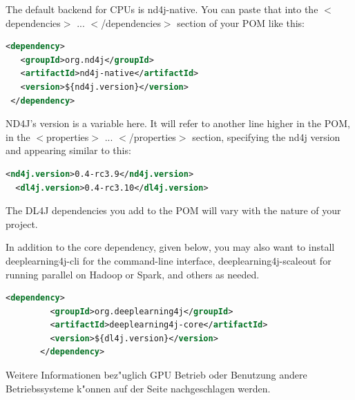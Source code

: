 {The default backend for CPUs is nd4j-native. You can paste that into the $<$dependencies$>$ ... $<$/dependencies$>$ section of your POM like this:
\lstset{language=XML}
\begin{lstlisting}[language=XML,caption=applicationContext.xml]
 <dependency>
   <groupId>org.nd4j</groupId>
   <artifactId>nd4j-native</artifactId>
   <version>${nd4j.version}</version>
 </dependency>
\end{lstlisting}

ND4J’s version is a variable here. It will refer to another line higher in the POM, in the $<$properties$>$ ... 
$<$/properties$>$ section, specifying the nd4j version and appearing similar to this:
\begin{lstlisting}[language=XML,caption=applicationContext.xml]
  <nd4j.version>0.4-rc3.9</nd4j.version>
  <dl4j.version>0.4-rc3.10</dl4j.version>
\end{lstlisting}

The DL4J dependencies you add to the POM will vary with the nature of your project.

In addition to the core dependency, given below, you may also want to install deeplearning4j-cli for the command-line interface, deeplearning4j-scaleout for running parallel on Hadoop or Spark, and others as needed.
\begin{lstlisting}[language=XML,caption=applicationContext.xml]
	   <dependency>
	     <groupId>org.deeplearning4j</groupId>
	     <artifactId>deeplearning4j-core</artifactId>
	     <version>${dl4j.version}</version>
	   </dependency>
\end{lstlisting}

Weitere Informationen bez"uglich GPU Betrieb oder Benutzung andere Betriebssysteme k"onnen auf der \cite{ND4J} Seite nachgeschlagen werden.
}